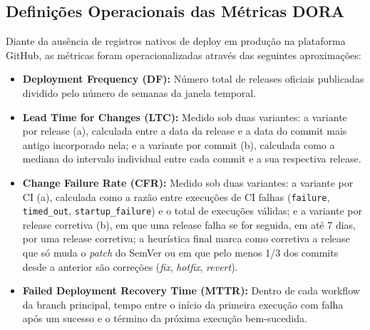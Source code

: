 \documentclass[12pt]{article}
\begin{document}
\subsection{Definições Operacionais das Métricas DORA}
Diante da ausência de registros nativos de deploy em produção na plataforma GitHub, as métricas foram operacionalizadas através das seguintes aproximações:
\begin{itemize}
    \item \textbf{Deployment Frequency (DF):} Número total de releases oficiais publicadas dividido pelo número de semanas da janela temporal.
    \item \textbf{Lead Time for Changes (LTC):} Medido sob duas variantes: a variante por release (a), calculada entre a data da release e a data do commit mais antigo incorporado nela; e a variante por commit (b), calculada como a mediana do intervalo individual entre cada commit e a sua respectiva release.
    \item \textbf{Change Failure Rate (CFR):} Medido sob duas variantes: a variante por CI (a), calculada como a razão entre execuções de CI falhas (\texttt{failure}, \texttt{timed\_out}, \texttt{startup\_failure}) e o total de execuções válidas; e a variante por release corretiva (b), em que uma release falha se for seguida, em até 7 dias, por uma release corretiva; a heurística final marca como corretiva a release que só muda o \textit{patch} do SemVer ou em que pelo menos 1/3 dos commits desde a anterior são correções (\textit{fix}, \textit{hotfix}, \textit{revert}).
    \item \textbf{Failed Deployment Recovery Time (MTTR):} Dentro de cada workflow da branch principal, tempo entre o início da primeira execução com falha após um sucesso e o término da próxima execução bem-sucedida.
\end{itemize}
\end{document}
